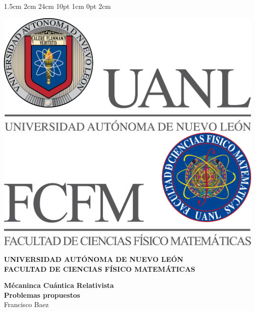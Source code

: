 \documentclass[12pt,letterpaper]{report}
\begin{document}
\setmargins{2.5cm}      
{1.5cm}                     
{2cm}  
{24cm}                    
{10pt}                          
{1cm}                          
{0pt}                             
{2cm}
\begin{titlepage}
\begin{center}
\includegraphics[scale=0.40]{../../Logos/uanl.png} 
\hspace{2.5cm}
\includegraphics[scale=0.40]{../../Logos/fcfm.png}
\end{center}
\vspace{2cm}
\begin{center}
\textbf{
UNIVERSIDAD AUTÓNOMA DE NUEVO LEÓN\\
FACULTAD DE CIENCIAS
    FÍSICO MATEMÁTICAS}\\
\vspace*{2cm}
\begin{large}
\vspace{1cm}
\large{\textbf{Mécaninca Cuántica Relativista}}\\
\textbf{Problemas propuestos}\\
Francisco Baez\\
\end{large}
\end{center}
\end{titlepage}
\end{document}
